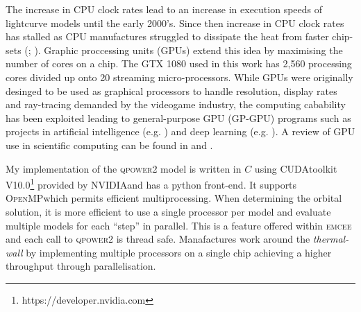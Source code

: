 
The increase in CPU clock rates lead to an increase in execution speeds of lightcurve models until the early 2000's. Since then increase in CPU clock rates has stalled as CPU manufactures struggled to dissipate the heat from faster chip-sets (\citealt{2018arXiv181006250S}; \citealt{patterson2014computer}). Graphic proccessing units (GPUs) extend this idea by maximising the number of cores on a chip. The GTX 1080 used in this work has 2,560 processing cores divided up onto 20 streaming micro-processors.  While GPUs were originally desinged to be used as graphical processors to handle resolution, display rates and ray-tracing demanded by the videogame industry, the computing cabability has been exploited leading to general-purpose GPU (GP-GPU) programs such as projects in artificial intelligence (e.g. \citet{2017SPIE10454E..06B}) and deep learning (e.g. \citet{2018arXiv180404806O}). A review of GPU use in scientific computing can be found in \citet{Owens2007} and \citet{Owens2008}.



My implementation of the \textsc{qpower2} model is written in $C$ using \textsc{CUDA}\textregistered  toolkit V10.0\footnote{https://developer.nvidia.com} provided by \textsc{NVIDIA}\textregistered and has a python front-end. It supports \textsc{OpenMP}\textregistered  which permits efficient multiprocessing. When determining the orbital solution, it is more efficient to use a single processor per model and evaluate multiple models for each ``step'' in parallel. This is a feature offered within \textsc{emcee} and each call to \textsc{qpower2} is thread safe. Manafactures work around the \textit{thermal-wall} by implementing multiple processors on a single chip achieving a higher throughput through parallelisation. 

